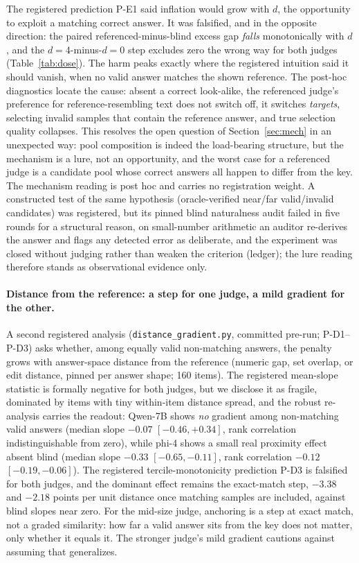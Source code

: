 \documentclass[11pt]{article}
\begin{document}
The registered prediction P-E1 said inflation would grow with $d$, the opportunity to exploit a matching correct answer.
It was falsified, and in the opposite direction: the paired referenced-minus-blind excess gap \emph{falls} monotonically with $d$, and the $d{=}4$-minus-$d{=}0$ step excludes zero the wrong way for both judges (Table~\ref{tab:dose}).
The harm peaks exactly where the registered intuition said it should vanish, when no valid answer matches the shown reference.
The post-hoc diagnostics locate the cause: absent a correct look-alike, the referenced judge's preference for reference-resembling text does not switch off, it switches \emph{targets}, selecting invalid samples that contain the reference answer, and true selection quality collapses.
This resolves the open question of Section~\ref{sec:mech} in an unexpected way: pool composition is indeed the load-bearing structure, but the mechanism is a lure, not an opportunity, and the worst case for a referenced judge is a candidate pool whose correct answers all happen to differ from the key.
The mechanism reading is post hoc and carries no registration weight.
A constructed test of the same hypothesis (oracle-verified near/far valid/invalid candidates) was registered, but its pinned blind naturalness audit failed in five rounds for a structural reason, on small-number arithmetic an auditor re-derives the answer and flags any detected error as deliberate, and the experiment was closed without judging rather than weaken the criterion (ledger); the lure reading therefore stands as observational evidence only.

\paragraph{Distance from the reference: a step for one judge, a mild gradient for the other.}
A second registered analysis (\texttt{distance\_gradient.py}, committed pre-run; P-D1--P-D3) asks whether, among equally valid non-matching answers, the penalty grows with answer-space distance from the reference (numeric gap, set overlap, or edit distance, pinned per answer shape; 160 items).
The registered mean-slope statistic is formally negative for both judges, but we disclose it as fragile, dominated by items with tiny within-item distance spread, and the robust re-analysis carries the readout: Qwen-7B shows \emph{no} gradient among non-matching valid answers (median slope $-0.07$ $[-0.46, +0.34]$, rank correlation indistinguishable from zero), while phi-4 shows a small real proximity effect absent blind (median slope $-0.33$ $[-0.65, -0.11]$, rank correlation $-0.12$ $[-0.19, -0.06]$).
The registered tercile-monotonicity prediction P-D3 is falsified for both judges, and the dominant effect remains the exact-match step, $-3.38$ and $-2.18$ points per unit distance once matching samples are included, against blind slopes near zero.
For the mid-size judge, anchoring is a step at exact match, not a graded similarity: how far a valid answer sits from the key does not matter, only whether it equals it.
The stronger judge's mild gradient cautions against assuming that generalizes.
\end{document}
